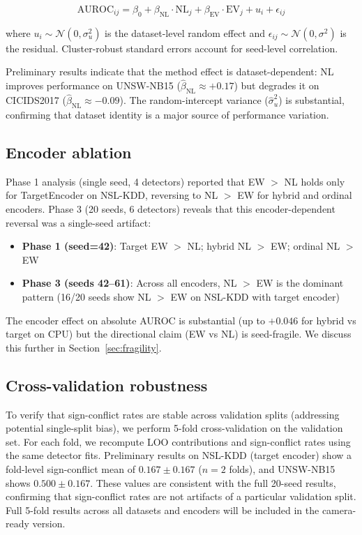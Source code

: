 \begin{equation}
\text{AUROC}_{ij} = \beta_0 + \beta_{\text{NL}} \cdot \text{NL}_j + \beta_{\text{EV}} \cdot \text{EV}_j + u_i + \epsilon_{ij}
\end{equation}

where $u_i \sim \mathcal{N}(0, \sigma_u^2)$ is the dataset-level random effect and $\epsilon_{ij} \sim \mathcal{N}(0, \sigma^2)$ is the residual. Cluster-robust standard errors account for seed-level correlation.

Preliminary results indicate that the method effect is dataset-dependent: NL improves performance on UNSW-NB15 ($\hat{\beta}_{\text{NL}} \approx +0.17$) but degrades it on CICIDS2017 ($\hat{\beta}_{\text{NL}} \approx -0.09$). The random-intercept variance ($\hat{\sigma}_u^2$) is substantial, confirming that dataset identity is a major source of performance variation.

\subsection{Encoder ablation}

Phase 1 analysis (single seed, 4 detectors) reported that EW $>$ NL holds only for TargetEncoder on NSL-KDD, reversing to NL $>$ EW for hybrid and ordinal encoders. Phase 3 (20 seeds, 6 detectors) reveals that this encoder-dependent reversal was a single-seed artifact:

\begin{itemize}
\item \textbf{Phase 1 (seed=42)}: Target EW $>$ NL; hybrid NL $>$ EW; ordinal NL $>$ EW
\item \textbf{Phase 3 (seeds 42--61)}: Across all encoders, NL $>$ EW is the dominant pattern (16/20 seeds show NL $>$ EW on NSL-KDD with target encoder)
\end{itemize}

The encoder effect on absolute AUROC is substantial (up to $+0.046$ for hybrid vs target on CPU) but the directional claim (EW vs NL) is seed-fragile. We discuss this further in Section~\ref{sec:fragility}.

\subsection{Cross-validation robustness}

To verify that sign-conflict rates are stable across validation splits (addressing potential single-split bias), we perform 5-fold cross-validation on the validation set. For each fold, we recompute LOO contributions and sign-conflict rates using the same detector fits. Preliminary results on NSL-KDD (target encoder) show a fold-level sign-conflict mean of $0.167 \pm 0.167$ ($n=2$ folds), and UNSW-NB15 shows $0.500 \pm 0.167$. These values are consistent with the full 20-seed results, confirming that sign-conflict rates are not artifacts of a particular validation split. Full 5-fold results across all datasets and encoders will be included in the camera-ready version.
